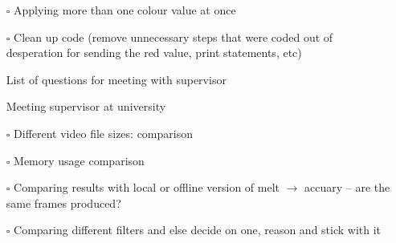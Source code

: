 \documentclass[a4, 11pt]{scrartcl}
\newcommand{\cmark}{\ding{51}}%
\newcommand{\done}{\rlap{$\square$}{\raisebox{2pt}{\large\hspace{1pt}\cmark}}%
	\hspace{-2.5pt}}
\begin{document}
\begin{description}
\begin{itemize}
	\item[$\square$] Applying more than one colour value at once
	
	
	
	\item[$\square$] Clean up code (remove unnecessary steps that were coded out of desperation for sending the red value, print statements, etc)
	
	\item[\done] List of questions for meeting with supervisor
	
	\item[\done] Meeting supervisor at university
	
	\item[$\square$] Different video file sizes: comparison
	
	\item[$\square$] Memory usage comparison
	
	\item[$\square$] Comparing results with local or offline version of melt $\rightarrow$ accuary -- are the same frames produced?
	
	\item[$\square$] Comparing different filters and else decide on one, reason and stick with it
	
	
	
\end{itemize}		
	
	
	
	
	
	
	
	
	
	
\end{description}	



	
	
	
	
\end{document}
